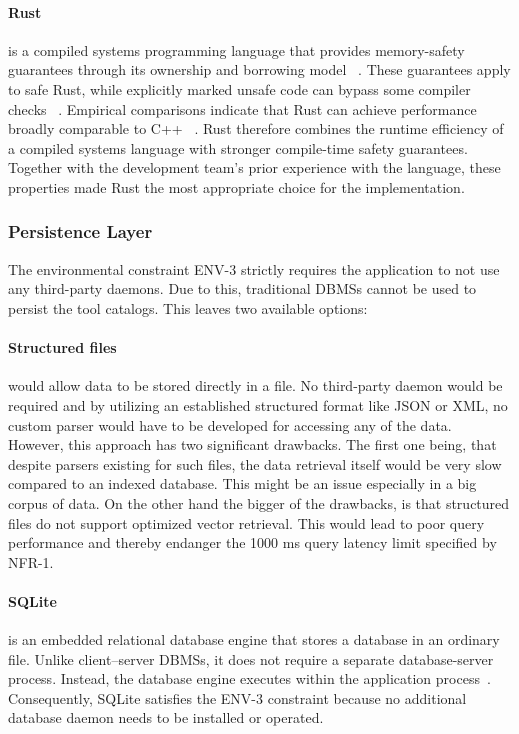 \paragraph{Rust} is a compiled systems programming language that provides memory-safety guarantees through its ownership and borrowing model ~\cite{jung2019safe}. These guarantees apply to safe Rust, while explicitly marked unsafe code can bypass some compiler checks ~\cite{evans2020rust}. Empirical comparisons indicate that Rust can achieve performance broadly comparable to C++ ~\cite{ivanov2022rust}. Rust therefore combines the runtime efficiency of a compiled systems language with stronger compile-time safety guarantees. Together with the development team's prior experience with the language, these properties made Rust the most appropriate choice for the implementation.

\subsubsection{Persistence Layer}

The environmental constraint ENV-3 strictly requires the application to not use any third-party daemons. Due to this, traditional \acp{DBMS} cannot be used to persist the tool catalogs. This leaves two available options:

\paragraph{Structured files} would allow data to be stored directly in a file. No third-party daemon would be required and by utilizing an established structured format like JSON or XML, no custom parser would have to be developed for accessing any of the data. However, this approach has two significant drawbacks. The first one being, that despite parsers existing for such files, the data retrieval itself would be very slow compared to an indexed database. This might be an issue especially in a big corpus of data. On the other hand the bigger of the drawbacks, is that structured files do not support optimized vector retrieval. This would lead to poor query performance and thereby endanger the 1000 ms query latency limit specified by NFR-1.

\paragraph{SQLite} is an embedded relational database engine that stores a database in an ordinary file. Unlike client--server \acp{DBMS}, it does not require a separate database-server process. Instead, the database engine executes within the application process~\cite{gaffney2022sqlite}. Consequently, SQLite satisfies the ENV-3 constraint because no additional database daemon needs to be installed or operated.

